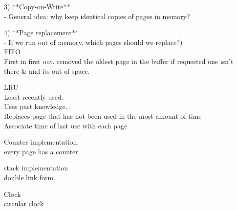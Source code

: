 \documentclass[a4paper,10pt,titlepage]{report}
\begin{document}
\vspace{5mm}

3) **Copy-on-Write**  \\
		- General idea: why keep identical copies of pages in memory? \\

\vspace{5mm}

4) **Page replacement**  \\
\hspace{10mm} - If we run out of memory, which pages should we replace?) \\


\hspace{10mm}FIFO\\
\hspace{15mm}First in first out. removed the oldest page in the buffer if requested one isn't there \& and its out of space.\\
\vspace{5mm}




\hspace{10mm}LRU \\
\hspace{15mm}Least recently used. \\
\hspace{15mm}Uses past knowledge.\\ 
\hspace{15mm}Replaces page that has not been used in the most amount of time \\
\hspace{15mm}Associate time of last use with each page\\
\vspace{5mm}




\hspace{10mm}Counter implementation.\\
 \hspace{15mm}   every page has a counter. \\
\vspace{5mm}



\hspace{10mm}stack implementation  \\
\hspace{15mm}    double link form. \\
    \vspace{5mm}
    
    
\hspace{10mm}Clock \\
\hspace{15mm}circular clock  \\
\vspace{5mm}
\end{document}
